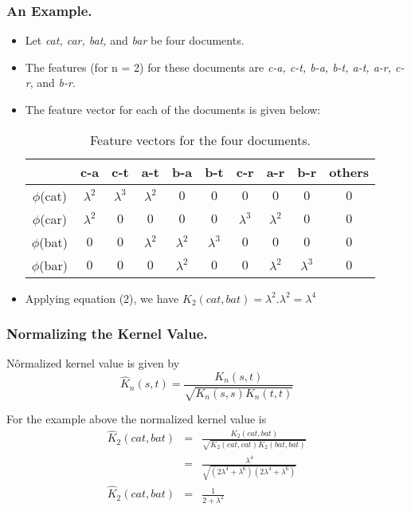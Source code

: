 \documentclass[10pt]{beamer}
\begin{document}
\begin{frame}
	\frametitle{An Example.}
	\begin{itemize}
		\item	Let \textit{cat, car, bat,} and \textit{bar} be four documents. 
		\item The features (for n = 2) for these documents are \textit{ c-a, c-t, b-a, b-t, a-t, a-r, c-r}, and \textit{b-r}. 
		\item The feature vector for each of the documents is given below:
	\begin{table}[h]
	\caption{Feature vectors for the four documents.} %
	\centering                          %
	\begin{tabular}{c c c c c c c c c c}  %
	\hline\hline                        %
	\ & c-a & c-t & a-t & b-a & b-t & c-r & a-r & b-r & others\\ %
	\hline                               %
	$\phi$(cat)  & $\lambda^2$ & $\lambda^3$ & $\lambda^2$ & $0$ & $0$ & $0$ & $0$ & $0$ & $0$\\ %
	$\phi$(car)  & $\lambda^2$ & $0$ & $0$ & $0$ & $0$ & $\lambda^3$ & $\lambda^2$ & $0$ & $0$ \\ %
	$\phi$(bat)  & $0$ & $0$ & $\lambda^2$ & $\lambda^2$ & $\lambda^3$ & $0$ & $0$ & $0$ & $0$  \\ %
	$\phi$(bar)  & $0$ & $0$ & $0$ & $\lambda^2$ & $0$ & $0$ & $\lambda^2$ & $\lambda^3$ & $0$ \\ %
	\hline                          %
	\end{tabular}
	\label{tab:hresult}
	\end{table}

	\item Applying equation (2), we have $K_2(cat,bat) = \lambda^2 . \lambda^2 = \lambda^4$
	\end{itemize}
\end{frame}

\begin{frame}
	\frametitle{Normalizing the Kernel Value.}
	N\^ormalized kernel value is given by
	\begin{equation}
		\hat{K}_n(s,t) = \frac{K_n(s,t)}{\sqrt{K_n(s,s) K_n(t,t)}}
	\end{equation}

	For the example above the normalized kernel value is \\
	\begin{eqnarray*}
		\hat{K}_2(cat,bat) & = & \frac{K_2(cat,bat)}{\sqrt{K_2(cat,cat) K_2(bat,bat)}}\\
			 & = & \frac{\lambda^4}{\sqrt{(2\lambda^4+\lambda^6)(2\lambda^4+\lambda^6)}}\\
		\hat{K}_2(cat,bat) & = & \frac{1}{2+\lambda^2}
	\end{eqnarray*}
\end{frame}
\end{document}
